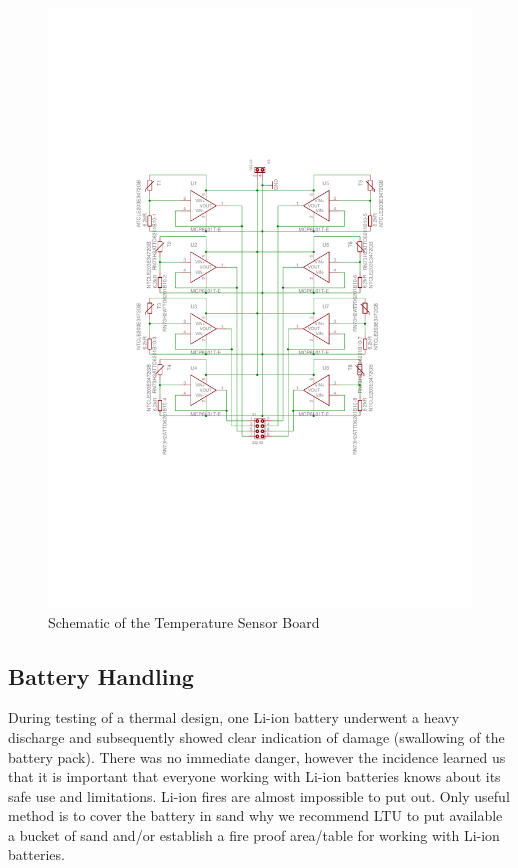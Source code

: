 \begin{figure}[H]
\centering
\includegraphics[width=\textwidth]{figures/fig_Schematic_TS}
\caption{Schematic of the Temperature Sensor Board}
\label{fig:Schematic_TS}
\end{figure}
%
%
\subsection*{Battery Handling}
%
%
During testing of a thermal design, one Li-ion battery underwent a heavy discharge and subsequently showed clear indication of damage (swallowing of the battery pack). There was no immediate danger, however the incidence learned us that it is important that everyone working with Li-ion batteries knows about its safe use and limitations. Li-ion fires are almost impossible to put out. Only useful method is to cover the battery in sand why we recommend LTU to put available a bucket of sand and/or establish a fire proof area/table for working with Li-ion batteries.
%
%
%

